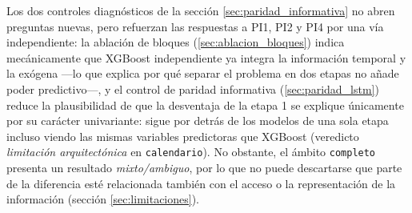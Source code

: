 Los dos controles diagnósticos de la sección \ref{sec:paridad_informativa} no abren
preguntas nuevas, pero refuerzan las respuestas a PI1, PI2 y PI4 por una vía
independiente: la ablación de bloques (\ref{sec:ablacion_bloques}) indica
mecánicamente que XGBoost independiente ya integra la información temporal y la exógena
—lo que explica por qué separar el problema en dos etapas no añade poder predictivo—, y el
control de paridad informativa (\ref{sec:paridad_lstm}) reduce la plausibilidad de que la
desventaja de la etapa 1 se explique únicamente por su carácter univariante: sigue por
detrás de los modelos de una sola etapa incluso viendo las mismas variables predictoras que
XGBoost (veredicto \emph{limitación arquitectónica} en \texttt{calendario}). No obstante,
el ámbito \texttt{completo} presenta un resultado \emph{mixto/ambiguo}, por lo que no puede
descartarse que parte de la diferencia esté relacionada también con el acceso o la
representación de la información (sección \ref{sec:limitaciones}).
